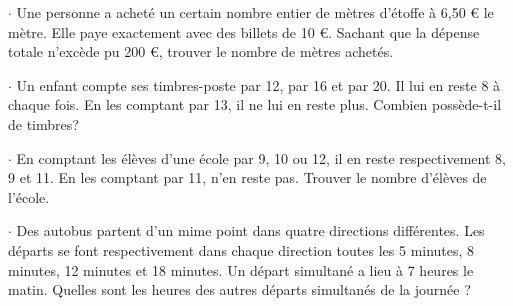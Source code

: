 $\cdot$   Une personne a acheté un certain nombre entier de mètres d'étoffe à 6,50 € le mètre. Elle paye exactement avec des billets de 10 €. Sachant que la dépense totale n'excède pu 200 €, trouver le nombre de mètres achetés. 
   
$\cdot$   Un enfant compte ses timbres-poste par 12, par 16 et par 20. Il lui en reste 8 à chaque fois. En les comptant par 13, il ne lui en reste plus. Combien possède-t-il de timbres?
    
$\cdot$   En comptant les élèves d'une école par 9, 10 ou 12, il en reste respectivement 8, 9 et 11. En les comptant par 11, n'en reste pas. Trouver le nombre d'élèves de l'école.

$\cdot$   Des autobus partent d'un mime point dans quatre directions différentes. Les départs se font respectivement dans chaque direction toutes les 5 minutes, 8 minutes, 12 minutes et 18 minutes. Un départ simultané a lieu à 7 heures le matin. Quelles sont les heures des autres départs simultanés de la journée ? 




